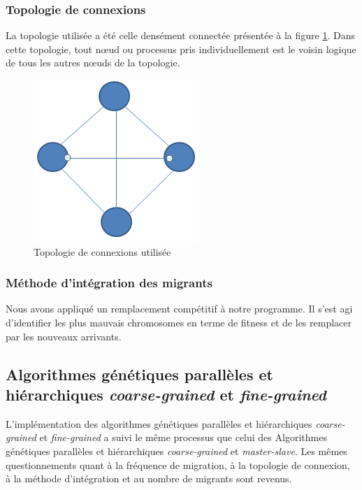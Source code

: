	\subsubsection{Topologie de connexions}
	La topologie utilisée a été celle densément connectée présentée à la figure \ref{fig:topology_fig}. Dans cette topologie, tout nœud ou processus pris individuellement est le voisin logique de tous les autres nœuds de la topologie.
	
	\begin{figure}[!h]
		\begin{center}
			\includegraphics[scale=.3]{images/topology_fig.png}
			\caption{Topologie de connexions utilisée}
			\label{fig:topology_fig}
		\end{center}
	\end{figure}
	
	\subsubsection{Méthode d'intégration des migrants}
 	
 	Nous avons appliqué un remplacement compétitif à notre programme. Il s'est agi d'identifier les plus mauvais chromosomes en terme de fitness et de les remplacer par les nouveaux arrivants.
 	
	\subsection{Algorithmes génétiques parallèles et hiérarchiques \emph{coarse-grained} et \emph{fine-grained}}
	
	L'implémentation des algorithmes génétiques parallèles et hiérarchiques \emph{coarse-grained} et \emph{fine-grained} a suivi le même processus que celui des Algorithmes génétiques parallèles et hiérarchiques \emph{coarse-grained} et \emph{master-slave}. Les mêmes questionnements quant à la fréquence de migration, à la topologie de connexion, à la méthode d'intégration et au nombre de migrants sont revenus.
	
